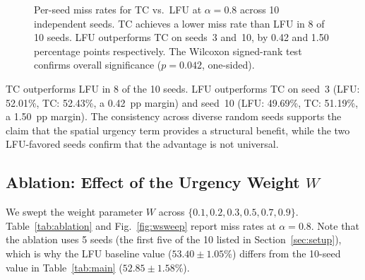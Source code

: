 \documentclass[preprint,12pt]{elsarticle}
\begin{document}
	\begin{figure}[t]
		\centering
		\caption{Per-seed miss rates for TC vs.\ LFU at $\alpha=0.8$ across 10 independent seeds. TC achieves a lower miss rate than LFU in 8 of 10 seeds. LFU outperforms TC on seeds~3 and~10, by 0.42 and 1.50 percentage points respectively. The Wilcoxon signed-rank test confirms overall significance ($p=0.042$, one-sided).}
		\label{fig:perseed}
	\end{figure}
	
	TC outperforms LFU in 8 of the 10 seeds. LFU outperforms TC on seed~3 (LFU: 52.01\%, TC: 52.43\%, a 0.42~pp margin) and seed~10 (LFU: 49.69\%, TC: 51.19\%, a 1.50~pp margin). The consistency across diverse random seeds supports the claim that the spatial urgency term provides a structural benefit, while the two LFU-favored seeds confirm that the advantage is not universal.
	
	\subsection{Ablation: Effect of the Urgency Weight $W$}
	\label{sec:wsweep}
	
	We swept the weight parameter $W$ across $\{0.1, 0.2, 0.3, 0.5, 0.7, 0.9\}$. Table~\ref{tab:ablation} and Fig.~\ref{fig:wsweep} report miss rates at $\alpha=0.8$. Note that the ablation uses 5 seeds (the first five of the 10 listed in Section~\ref{sec:setup}), which is why the LFU baseline value ($53.40 \pm 1.05$\%) differs from the 10-seed value in Table~\ref{tab:main} ($52.85 \pm 1.58$\%).
	
\end{document}
